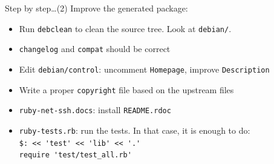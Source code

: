 \documentclass[10pt,final]{beamer}
\begin{document}
\begin{frame}[fragile]{Step by step\ldots (2)}
Improve the generated package:
\begin{itemize}
	\item Run \texttt{debclean} to clean the source tree. Look at \texttt{debian/}.
		\hbr
	\item \texttt{changelog} and \texttt{compat} should be correct
		\hbr
	\item Edit \texttt{debian/control}: uncomment \texttt{Homepage}, improve \texttt{Description}
		\hbr
	\item Write a proper \texttt{copyright} file based on the upstream files
		\hbr
	\item \texttt{ruby-net-ssh.docs}: install \texttt{README.rdoc}
		\hbr
	\item \texttt{ruby-tests.rb}: run the tests. In that case, it is enough to do:\\
		\verb+$: << 'test' << 'lib' << '.'+\\
		\verb+require 'test/test_all.rb'+
\end{itemize}
\end{frame}
\end{document}
